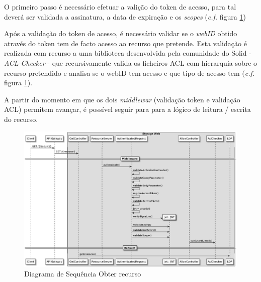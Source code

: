 O primeiro passo é necessário efetuar a valição do token de acesso, para tal deverá ser validada a assinatura, a data de expiração e os \emph{scopes} (\emph{c.f.} figura \ref{retrieve_resource_sd})

Após a validação do token de acesso, é necessário validar se o \emph{webID} obtido através do token tem de facto acesso ao recurso que pretende. Esta validação é realizada com recurso a uma biblioteca desenvolvida pela comunidade do Solid - \emph{ACL-Checker} - que recursivamente valida os ficheiros ACL com hierarquia sobre o recurso pretendido e analisa se o webID tem acesso e que tipo de acesso tem (\emph{c.f.} figura \ref{retrieve_resource_sd}).

A partir do momento em que os dois \emph{middlewar} (validação token e validação ACL) permitem avançar, é possível seguir para para a lógico de leitura / escrita do recurso.

\begin{figure}[H]
    \begin{center}
    \includegraphics[width=1 \textwidth]{figures/retrieve_resource_sd_complete.eps}
    \caption{Diagrama de Sequência Obter recurso}
            \label{retrieve_resource_sd}
    \end{center}
\end{figure}












